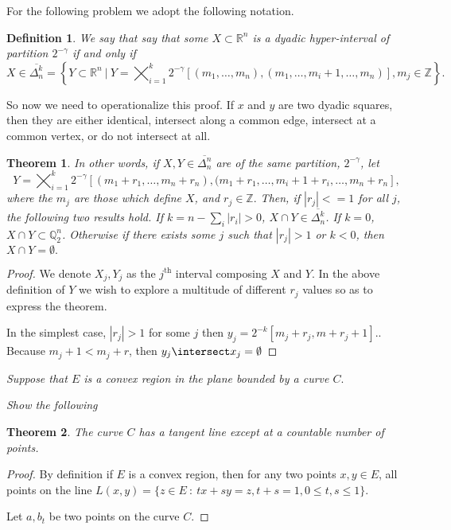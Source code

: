 \documentclass[letter]{article}
\newtheorem{theorem}{Theorem}
\newtheorem{definition}{Definition}
\newenvironment{menumerate}{%
  \edef\backupindent{\the\parindent}%
  \enumerate%
  \setlength{\parindent}{\backupindent}%
}{\endenumerate}
\begin{document}
\begin{menumerate}
\begin{menumerate}
 			\item For the following problem we adopt the following notation.
 				\begin{definition}
 				 We say that say that some $X \subset \mathbb{R}^n$ is a dyadic hyper-interval of partition $2^{-\gamma}$ if and only if 
 				 $$X \in \overline{\Delta_n^k} = \left\{ Y \subset \mathbb{R}^n\ |\ Y = \bigtimes_{i=1}^k2^{-\gamma}\left[(m_1,\dots,m_n),(m_1 , \dots,m_i +1,\dots, m_n)\right], m_j \in \mathbb{Z} \right\}. $$
 				\end{definition}
 					So now we need to operationalize this proof. If $x$ and $y$ are two dyadic squares, then they are either identical, intersect along a common edge, intersect at a common vertex, or do not intersect at all.
				\begin{theorem}
					  In other words, if $X,Y \in \overline{\Delta_n^n}$ are of the same partition, $2^{-\gamma}$, let
					   $$Y = \bigtimes_{i=1}^k2^{-\gamma}\left[(m_1 + r_1,\dots,m_n + r_n),(m_1 + r_1, \dots,m_i +1 + r_i,\dots, m_n + r_n\right],$$ 
					   where the $m_j$ are those which define $X$, and $r_j \in \mathbb{Z}.$ Then, if $|r_j| <= 1$ for all $j$, the following two results hold. If $k = n - \sum_i|r_i| > 0$,  $X \cap Y \in \overline{\Delta_n^k}$. If $k = 0$, $X \cap Y \subset \mathbb{Q}_2^n$. Otherwise if there exists some $j$ such that $|r_j| > 1$ or $k < 0$, then $X \cap Y = \emptyset.$

				\end{theorem}
				\begin{proof}
					We denote $X_j, Y_j$ as the $j^\mathrm{th}$ interval composing $X$ and $Y$. In the above definition of $Y$ we wish to explore a multitude of different $r_j$ values so as to express the theorem.

					In the simplest case, $|r_j| > 1$ for some $j$ then $y_j = 2^{-k}[m_j + r_j, m+r_j+1].$. Because $m_j + 1 < m_j + r$, then $y_j \intersect x_j = \emptyset$
 				\end{proof}
		\end{menumerate} 


		\setcounter{enumi}{31}
		\item \textit{Suppose that $E$ is a convex region in the plane bounded by a curve $C.$}
			\begin{menumerate}
				\item \textit{Show the following}
					\begin{theorem}
						The curve $C$ has a tangent line except at a countable number of points.
					\end{theorem}

					\begin{proof}
						By definition if $E$ is a convex region, then for any two points $x,y \in E$, all points on the line $L(x,y) = \{z \in E\ :\ tx +sy = z, t+s = 1, 0 \leq t,s\leq 1\}.$ 

						Let $a,b_t$ be two points on the curve $C$. 
					\end{proof}
			\end{menumerate} 

		
		
\end{menumerate}
\end{document}
